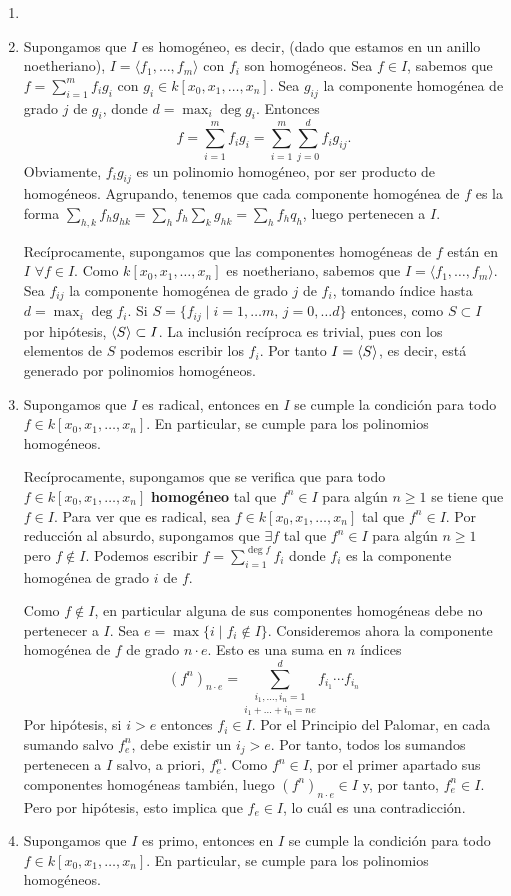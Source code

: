 \documentclass[twoside]{article}
\begin{document}
\begin{solucion}
\begin{enumerate}
\item[]
\item Supongamos que $I$ es homogéneo, es decir, (dado que estamos en un anillo noetheriano), $I=\langle f_1,\dots, f_m\rangle$ con $f_i$ son homogéneos. Sea $f\in I$, sabemos que $f=\sum_{i=1}^mf_ig_i$ con $g_i\in k[x_0,x_1,\dots,x_n]$. Sea $g_{ij}$ la componente homogénea de grado $j$ de $g_i$, donde $d=\max_{i} \deg{g_i}$. Entonces
$$f=\sum_{i=1}^m f_i g_i= \sum_{i=1}^m\sum_{j=0}^d f_ig_{ij}.$$
Obviamente, $f_i g_{ij}$ es un polinomio homogéneo, por ser producto de homogéneos. Agrupando, tenemos que cada componente homogénea de $f$ es la forma $ \sum_{h,k} f_hg_{hk} = \sum_{h}f_h\sum_{k} g_{hk}= \sum_{h}f_h q_h$, luego pertenecen a $I$.

Recíprocamente, supongamos que las componentes homogéneas de $f$ están en $I$ $\forall f \in I$. Como $k[x_0,x_1,\dotsc,x_n]$ es noetheriano, sabemos que $I=\langle f_1,\dots, f_m\rangle$. Sea $f_{ij}$ la componente homogénea de grado $j$ de $f_i$, tomando índice hasta $d=\max_{i} \deg{f_i}$. Si $S=\{f_{ij} \mid i=1,\dotsc m,\,j=0,\dotsc d\}$ entonces, como $S\subset I$ por hipótesis, $\langle{S}\rangle \subset I$. La inclusión recíproca es trivial, pues con los elementos de $S$ podemos escribir los $f_i$. Por tanto $I=\langle{S}\rangle$, es decir, está generado por polinomios homogéneos.

\item Supongamos que $I$ es radical, entonces en $I$ se cumple la condición para todo $f\in k[x_0,x_1,\dots,x_n]$. En particular, se cumple para los polinomios homogéneos.

Recíprocamente, supongamos que se verifica que para todo $f \in k[x_0, x_1,\dots, x_n]$ \textbf{homogéneo} tal que $f^n \in I$ para algún $n \geq 1$ se tiene que $f \in I$. Para ver que es radical, sea $f \in k[x_0, x_1,\dots, x_n]$ tal que $f^n \in I$. Por reducción al absurdo, supongamos que $\exists f$ tal que $f^n \in I$ para algún $n\geq 1$ pero $f\notin I$. Podemos escribir $f = \sum_{i=1}^{\deg{f}} f_i$ donde $f_i$ es la componente homogénea de grado $i$ de $f$. 

Como $f \notin I$, en particular alguna de sus componentes homogéneas debe no pertenecer a $I$. Sea $e=\max{\{i\mid f_i \notin I\}}$. Consideremos ahora la componente homogénea de $f$ de grado $n\cdot e$. Esto es una suma en $n$ índices
$$
(f^n)_{n\cdot e} = \underset{i_1+\dotsc+i_n=ne}{\sum_{i_1,\dotsc,i_n =1}^d} f_{i_1}\cdots f_{i_n}
$$
Por hipótesis, si $i>e$ entonces $f_i \in I$. Por el Principio del Palomar, en cada sumando salvo $f_e^n$, debe existir un $i_j >e$. Por tanto, todos los sumandos pertenecen a $I$ salvo, a priori, $f_e^n$. Como $f^n \in I$, por el primer apartado sus componentes homogéneas también, luego $(f^n)_{n\cdot e}\in I$ y, por tanto, $f_e^n \in I$. Pero por hipótesis, esto implica que $f_e\in I$, lo cuál es una contradicción.
\item Supongamos que $I$ es primo, entonces en $I$ se cumple la condición para todo $f\in k[x_0,x_1,\dots,x_n]$. En particular, se cumple para los polinomios homogéneos.


\end{enumerate}
\end{solucion}
\end{document}
